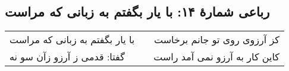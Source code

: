 \begin{center}
\section*{رباعی شمارهٔ ۱۴: با یار بگفتم به زبانی که مراست}
\label{sec:014}
\begin{longtable}{l p{0.5cm} r}
با یار بگفتم به زبانی که مراست
&&
کز آرزوی روی تو جانم برخاست
\\
گفتا: قدمی ز آرزو زآن سو نه
&&
کاین کار به آرزو نمی آمد راست
\\
\end{longtable}
\end{center}
